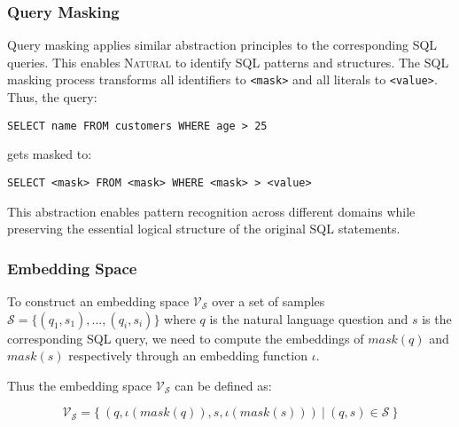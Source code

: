 \subsubsection{Query Masking}

Query masking applies similar abstraction principles to the corresponding SQL queries.
This enables \textsc{Natural} to identify SQL patterns and structures.
The SQL masking process transforms all identifiers to \texttt{<mask>} and all
literals to \texttt{<value>}. Thus, the query:

\begin{verbatim}
SELECT name FROM customers WHERE age > 25
\end{verbatim}

gets masked to:

\begin{verbatim}
SELECT <mask> FROM <mask> WHERE <mask> > <value>
\end{verbatim}

This abstraction enables pattern recognition across different domains while
preserving the essential logical structure of the original SQL statements.

\subsubsection{Embedding Space}

To construct an embedding space $\mathcal{V}_{\mathcal{S}}$ over a set of samples $\mathcal{S} = \{(q_1, s_1), ..., (q_i, s_i)\}$
where $q$ is the natural language question and $s$ is the corresponding SQL query, we need to compute
the embeddings of $mask(q)$ and $mask(s)$ respectively through an embedding function $\iota$. %

Thus the embedding space $\mathcal{V}_{\mathcal{S}}$ can be defined as:

$$\mathcal{V}_{\mathcal{S}} = \{~(q, \iota(mask(q)), s, \iota(mask(s)))~|~(q, s) \in \mathcal{S}~\}$$


